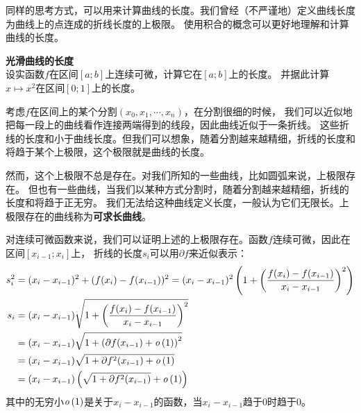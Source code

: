 \documentclass[12pt,UTF8,fontset=none]{ctexbook}
\begin{document}
同样的思考方式，可以用来计算曲线的长度。我们曾经（不严谨地）定义曲线长度为曲线上的点连成的折线长度的上极限。
使用积合的概念可以更好地理解和计算曲线的长度。

\begin{et}{\textbf{光滑曲线的长度}}\\
    设实函数$f$在区间$[a;b]$上连续可微，计算它在$[a;b]$上的长度。
    并据此计算$x\mapsto x^2$在区间$[0;1]$上的长度。    
\end{et}

\begin{so}
    考虑$f$在区间上的某个分割$(x_0, x_1, \cdots, x_n)$，在分割很细的时候，
    我们可以近似地把每一段上的曲线看作连接两端得到的线段，因此曲线近似于一条折线。
    这些折线的长度和小于曲线长度。但我们可以想象，随着分割越来越精细，折线的长度和将趋于某个上极限，这个极限就是曲线的长度。

    然而，这个上极限不总是存在。对我们所知的一些曲线，比如圆弧来说，上极限存在。
    但也有一些曲线，当我们以某种方式分割时，随着分割越来越精细，折线的长度和将趋于正无穷。
    我们无法给这种曲线定义长度，一般认为它们无限长。上极限存在的曲线称为\textbf{可求长曲线}。

    对连续可微函数来说，我们可以证明上述的上极限存在。函数$f$连续可微，因此在区间$[x_{i-1};x_i]$上，
    折线的长度$s_i$可以用$\partial f$来近似表示：
    \begin{align*}
        s_i^2 &= (x_i - x_{i-1})^2 + (f(x_i) - f(x_{i-1}))^2 = (x_i - x_{i-1})^2\left( 1 + \left(\frac{f(x_i) - f(x_{i-1})}{x_i - x_{i-1}}\right)^2\right) \\
        s_i &= (x_i - x_{i-1})\sqrt{1 + \left(\frac{f(x_i) - f(x_{i-1})}{x_i - x_{i-1}}\right)^2} \\
        &= (x_i - x_{i-1})\sqrt{1 + \left(\partial f(x_{i-1}) + \mathit{o}\left(1\right)\right)^2}\\
        &= (x_i - x_{i-1})\sqrt{1 + \partial f^2(x_{i-1}) + \mathit{o}\left(1\right)}\\
        &= (x_i - x_{i-1})\left(\sqrt{1 + \partial f^2(x_{i-1})} + \mathit{o}\left(1\right)\right)
    \end{align*}
    其中的无穷小$\mathit{o}\left(1\right)$是关于$x_i - x_{i-1}$的函数，当$x_i - x_{i-1}$趋于$0$时趋于$0$。


\end{so}
\end{document}
